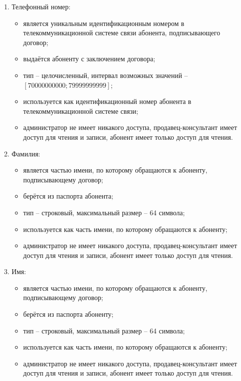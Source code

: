 \begin{enumerate}
\begin{enumerate}
        \item Телефонный номер:
        \begin{itemize}
            \item является уникальным идентификационным номером в телекоммуникационной системе связи абонента, подписывающего договор;
            \item выдаётся абоненту с заключением договора;
            \item тип -- целочисленный, интервал возможных значений -- $[70000000000; 79999999999]$;
            \item используется как идентификационный номер абонента в телекоммуникационной системе связи;
            \item администратор не имеет никакого доступа, продавец-консультант имеет доступ для чтения и записи, абонент имеет только доступ для чтения.
        \end{itemize}

        \item Фамилия:
        \begin{itemize}
            \item является частью имени, по которому обращаются к абоненту, подписывающему договор;
            \item берётся из паспорта абонента;
            \item тип -- строковый, максимальный размер -- 64 символа;
            \item используется как часть имени, по которому обращаются к абоненту;
            \item администратор не имеет никакого доступа, продавец-консультант имеет доступ для чтения и записи, абонент имеет только доступ для чтения.
        \end{itemize}

        \item Имя:
        \begin{itemize}
            \item является частью имени, по которому обращаются к абоненту, подписывающему договор;
            \item берётся из паспорта абоненту;
            \item тип -- строковый, максимальный размер -- 64 символа;
            \item используется как часть имени, по которому обращаются к абоненту;
            \item администратор не имеет никакого доступа, продавец-консультант имеет доступ для чтения и записи, абонент имеет только доступ для чтения.
        \end{itemize}


\end{enumerate}
\end{enumerate}
